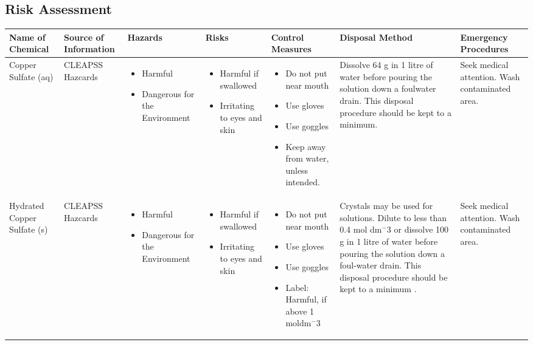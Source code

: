 \begin{landscape}

\section{Risk Assessment}

\begin{center}
\begin{longtable}{|p{1.5cm}|p{1.5cm}|p{3cm}|p{3cm}|p{3cm}|p{3cm}|p{2cm}|}
    \hline
 \textbf{Name of Chemical} & \textbf{Source of Information} & \textbf{Hazards} & \textbf{Risks} & \textbf{Control Measures} & \textbf{Disposal Method} & \textbf{Emergency Procedures} \\ \hline

Copper Sulfate (aq) &
CLEAPSS Hazcards &
\begin{itemize}
\item Harmful
\item Dangerous for the Environment \end{itemize} &
\begin{itemize}
\item Harmful if swallowed
\item Irritating to eyes and skin \end{itemize} &
\begin{itemize}
\item Do not put near mouth
\item Use gloves
\item Use goggles
\item Keep away from water, unless intended. \end{itemize} & 
Dissolve 64 g in 1 litre of water before pouring the solution down a foulwater drain. This disposal procedure should be kept to a minimum. &
Seek medical attention. Wash contaminated area. \\ \hline

Hydrated Copper Sulfate (s) &
CLEAPSS Hazcards &
\begin{itemize}
\item Harmful
\item Dangerous for the Environment \end{itemize} &
\begin{itemize}
\item Harmful if swallowed
\item Irritating to eyes and skin \end{itemize} &
\begin{itemize}
\item Do not put near mouth
\item Use gloves
\item Use goggles
\item Label: Harmful, if above 1 moldm$^-3$ \end{itemize} &
Crystals may be used for solutions. Dilute to less than 0.4 mol dm$^-3$ or dissolve 100 g in 1 litre of water before pouring the solution down a foul-water drain. This disposal procedure should be kept to a minimum . &
Seek medical attention. Wash contaminated area. \\ \hline




\end{longtable}
\end{center}
\end{landscape}
